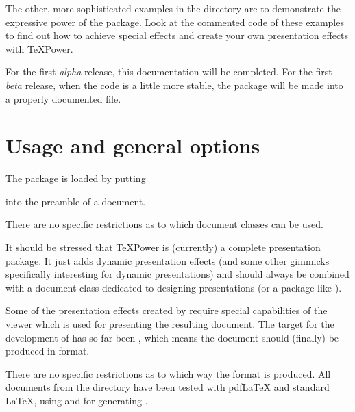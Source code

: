 \newslide

The other, more sophisticated examples in the  directory are to demonstrate the expressive power of the
 package. Look at the commented code of these examples to find out how to achieve special effects and
create your own presentation effects with \TeX Power.
  
For the first \emph{alpha} release, this documentation will be completed. For the first \emph{beta} release, when the
code is a little more stable, the  package will be made into a properly documented  file.

\newslide

%
\section{Usage and general options}
The  package is loaded by putting
\begin{center}
\end{center}
into the preamble of a document.
  
There are no specific restrictions as to which document classes can be used. 

It should be stressed that \TeX Power is  (currently) a complete presentation package. It just adds dynamic
presentation effects (and some other gimmicks specifically interesting for dynamic presentations) and should always be
combined with a document class dedicated to designing presentations (or a package like
\href{ftp://ftp.dante.de/tex-archive/help/Catalogue/entries/pdfslide.html}{}).
  
Some of the presentation effects created by  require special capabilities of the viewer which is used for
presenting the resulting document. The target for the development of  has so far been , which means the document should (finally) be produced in 
format.
  
There are no specific restrictions as to which way the  format is produced. All documents from the 
directory have been tested with pdf\LaTeX{} and standard \LaTeX, using  and  for generating .
  
